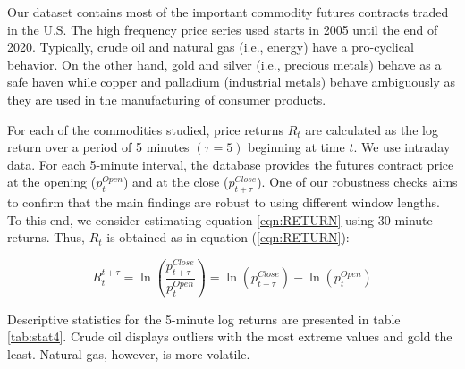\documentclass[12pt]{article}
\begin{document}
Our dataset contains most of the important commodity futures contracts traded in the U.S. The high frequency price series used starts in 2005 until the end of 2020.
Typically, crude oil and natural gas (i.e., energy) have a pro-cyclical behavior. On the other hand, gold and silver (i.e., precious metals) behave as a safe haven while copper and palladium (industrial metals) behave ambiguously as they are used in the manufacturing of consumer products.


For each of the commodities studied, price returns $R_t$ are calculated as the log return over a period of 5 minutes $(\tau=5)$ beginning at time $t$. We use intraday data. For each 5-minute interval, the database provides the futures contract price at the opening ($p_{t}^{Open}$)  and at the close ($p_{t+\tau}^{Close}$). One of our robustness checks aims to confirm that the main findings are robust to using different window lengths. To this end, we consider estimating equation \ref{eqn:RETURN}  using 30-minute returns.  Thus, $R_t$ is obtained  as in equation (\ref{eqn:RETURN}):

\begin{equation}\label{eqn:RETURN}
R_t^{t+\tau}=\ln \left( \frac{p_{t+\tau}^{Close}}{p_{t}^{Open}} \right)=\ln (p_{t+\tau}^{Close})-\ln(p_{t}^{Open})
\end{equation}

Descriptive statistics for the 5-minute log returns are presented in table \ref{tab:stat4}. Crude oil displays  outliers with the most extreme values and gold the least. Natural gas, however, is more volatile. %

\end{document}
